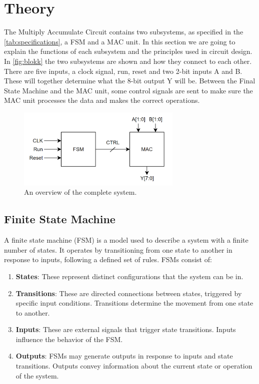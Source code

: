 \newpage
\section{Theory}
\label{sec:theory}

The Multiply Accumulate Circuit contains two subsystems, as specified in the \autoref{tab:specifications}, a FSM and a MAC unit. In this section we are going to explain the functions of each subsystem and the principles used in circuit design. In \autoref{fig:blokk} the two subsystems are shown and how they connect to each other. There are five inputs, a clock signal, run, reset and two 2-bit inputs A and B. These will together determine what the 8-bit output Y will be. Between the Final State Machine and the MAC unit, some control signals are sent to make sure the MAC unit processes the data and makes the correct operations. 

\begin{figure}[H]
    \centering
    \includegraphics[width=0.7\textwidth]{Figures/Blokk.png}
    \caption{An overview of the complete system.}
    \label{fig:blokk}
\end{figure}

\subsection{Finite State Machine}
\label{subsec:fsm_theory}

A finite state machine (FSM) is a model used to describe a system with a finite number of states. It operates by transitioning from one state to another in response to inputs, following a defined set of rules. FSMs consist of:

\begin{enumerate}
    \item \textbf{States}: These represent distinct configurations that the system can be in.
    
    \item \textbf{Transitions}: These are directed connections between states, triggered by specific input conditions. Transitions determine the movement from one state to another.
    
    \item \textbf{Inputs}: These are external signals that trigger state transitions. Inputs influence the behavior of the FSM.
    
    \item \textbf{Outputs}: FSMs may generate outputs in response to inputs and state transitions. Outputs convey information about the current state or operation of the system.
\end{enumerate}

